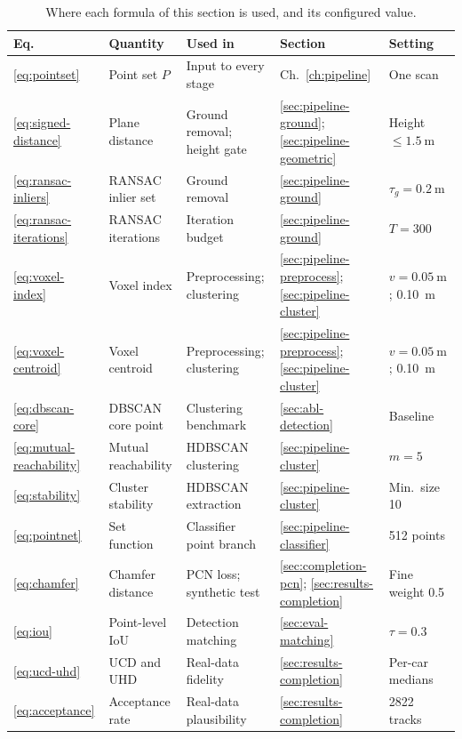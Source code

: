 \begin{table}[htbp]
  \centering
  \caption[Where each formula is used]{Where each formula of this section is used, and its
    configured value.}
  \label{tab:formula-usage}
  \small
  \setlength{\tabcolsep}{5pt}
  \begin{tabular}{@{}lllll@{}}
    \toprule
    Eq. & Quantity & Used in & Section & Setting \\
    \midrule
    \eqref{eq:pointset} & Point set $P$ & Input to every stage & Ch.~\ref{ch:pipeline} & One scan \\
    \eqref{eq:signed-distance} & Plane distance & Ground removal; height gate & \ref{sec:pipeline-ground}; \ref{sec:pipeline-geometric} & Height $\leq\SI{1.5}{\meter}$ \\
    \eqref{eq:ransac-inliers} & RANSAC inlier set & Ground removal & \ref{sec:pipeline-ground} & $\tau_g=\SI{0.2}{\meter}$ \\
    \eqref{eq:ransac-iterations} & RANSAC iterations & Iteration budget & \ref{sec:pipeline-ground} & $T=\num{300}$ \\
    \eqref{eq:voxel-index} & Voxel index & Preprocessing; clustering & \ref{sec:pipeline-preprocess}; \ref{sec:pipeline-cluster} & $v=\SI{0.05}{\meter}$; \SI{0.10}{\meter} \\
    \eqref{eq:voxel-centroid} & Voxel centroid & Preprocessing; clustering & \ref{sec:pipeline-preprocess}; \ref{sec:pipeline-cluster} & $v=\SI{0.05}{\meter}$; \SI{0.10}{\meter} \\
    \eqref{eq:dbscan-core} & DBSCAN core point & Clustering benchmark & \ref{sec:abl-detection} & Baseline \\
    \eqref{eq:mutual-reachability} & Mutual reachability & HDBSCAN clustering & \ref{sec:pipeline-cluster} & $m=\num{5}$ \\
    \eqref{eq:stability} & Cluster stability & HDBSCAN extraction & \ref{sec:pipeline-cluster} & Min.\ size \num{10} \\
    \eqref{eq:pointnet} & Set function & Classifier point branch & \ref{sec:pipeline-classifier} & \num{512} points \\
    \eqref{eq:chamfer} & Chamfer distance & PCN loss; synthetic test & \ref{sec:completion-pcn}; \ref{sec:results-completion} & Fine weight \num{0.5} \\
    \eqref{eq:iou} & Point-level IoU & Detection matching & \ref{sec:eval-matching} & $\tau=\num{0.3}$ \\
    \eqref{eq:ucd-uhd} & UCD and UHD & Real-data fidelity & \ref{sec:results-completion} & Per-car medians \\
    \eqref{eq:acceptance} & Acceptance rate & Real-data plausibility & \ref{sec:results-completion} & \num{2822} tracks \\
    \bottomrule
  \end{tabular}
\end{table}

